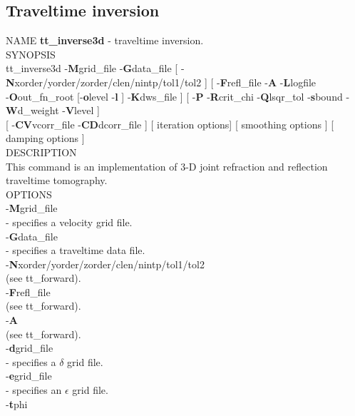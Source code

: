 \documentclass[twoside,final,onecolumn]{article}
\newcommand{\forceindent}{\leavevmode{\parindent=1em\indent}}
\begin{document}
\subsection{Traveltime inversion}

NAME \textbf{tt\_inverse3d} - traveltime inversion.\\[6pt]
SYNOPSIS \\
\forceindent tt\_inverse3d -\textbf{M}grid\_file -\textbf{G}data\_file [ -\textbf{N}xorder/yorder/zorder/clen/nintp/tol1/tol2 ] [ -\textbf{F}refl\_file -\textbf{A}
-\textbf{L}logfile \\
\forceindent -\textbf{O}out\_fn\_root [-\textbf{o}level -\textbf{l} ] -\textbf{K}dws\_file ] [ -\textbf{P} -\textbf{R}crit\_chi -\textbf{Q}lsqr\_tol
-\textbf{s}bound -\textbf{W}d\_weight -\textbf{V}level ] \\
\forceindent [ -\textbf{CV}vcorr\_file -\textbf{CD}dcorr\_file ] [ iteration options] [ smoothing options ] [ damping options ]\\[6pt]
DESCRIPTION \\
\forceindent This command is an implementation of 3-D joint refraction and reflection traveltime tomography.\\[6pt]
OPTIONS\\
\forceindent -\textbf{M}grid\_file \\
\forceindent\forceindent - specifies a velocity grid file.\\[6pt]
\forceindent -\textbf{G}data\_file \\
\forceindent\forceindent - specifies a traveltime data file.\\[6pt]
\forceindent -\textbf{N}xorder/yorder/zorder/clen/nintp/tol1/tol2 \\
\forceindent\forceindent (see tt\_forward).\\[6pt]
\forceindent -\textbf{F}refl\_file \\
\forceindent\forceindent (see tt\_forward).\\[6pt]
\forceindent -\textbf{A} \\
\forceindent\forceindent (see tt\_forward).\\[6pt]
\forceindent -\textbf{d}grid\_file \\
\forceindent\forceindent - specifies a $\delta$ grid file.\\[6pt]
\forceindent -\textbf{e}grid\_file \\
\forceindent\forceindent - specifies an $\epsilon$ grid file.\\[6pt]
\forceindent -\textbf{t}phi \\
\end{document}
